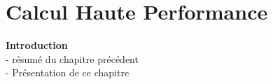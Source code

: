 \chapter{Calcul Haute Performance}\label{chap:hpc}
\minitoc

\textbf{Introduction}\\
- résumé du chapitre précédent\\
- Présentation de ce chapitre\\




\newpage



\newpage



\newpage



\newpage



\newpage





\printbibliography[heading=references,segment=\therefsegment]
